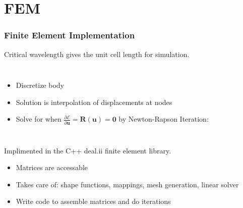 \documentclass{beamer}
\begin{document}
\section{FEM}
\begin{frame}
\frametitle{Finite Element Implementation}
Critical wavelength gives the unit cell length for simulation.
\begin{columns}
		\begin{itemize}
		\item Discretize body
		\item Solution is interpolation of displacements at nodes
		\item Solve for when $\frac{\partial\mathcal{E}}{\partial \mathbf{u}} = \mathbf{R}(\mathbf{u}) =  \mathbf{0}$ by Newton-Rapson Iteration:
		\end{itemize}
\end{columns}
\vspace{0.1in}
Implimented in the C++ deal.ii finite element library. 
\begin{itemize}
	\item \color{blue} Matrices are accessable
	\item Takes care of: shape functions, mappings, mesh generation, linear solver
	\item \color{red} Write code to assemble matrices and do iterations
\end{itemize}

\end{frame}
\end{document}

